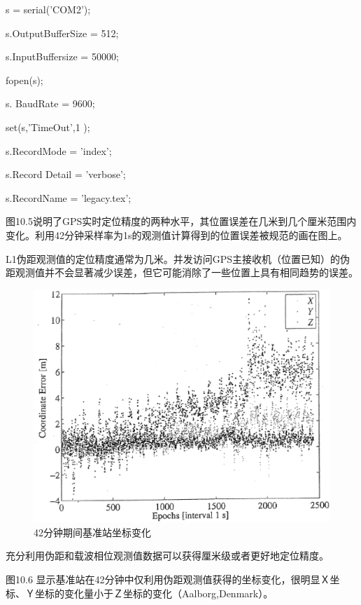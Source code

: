 s = serial('COM2');

s.OutputBufferSize = 512;

s.InputBuffersize = 50000;

fopen(s);

s. BaudRate = 9600;

set(s,'TimeOut',1 );

s.RecordMode = 'index';

s.Record Detail = 'verbose';

s.RecordName = 'legacy.tex';

图10.5说明了GPS实时定位精度的两种水平，其位置误差在几米到几个厘米范围内变化。利用42分钟采样率为1s的观测值计算得到的位置误差被规范的画在图上。

L1伪距观测值的定位精度通常为几米。并发访问GPS主接收机（位置已知）的伪距观测值并不会显著减少误差，但它可能消除了一些位置上具有相同趋势的误差。

\begin{figure}
	\centering
	\includegraphics[width=0.4\linewidth]{TeX_files/Part03/chapter10/image/9-6}
	\caption{42分钟期间基准站坐标变化}
	\label{fig:9-6}
\end{figure}

充分利用伪距和载波相位观测值数据可以获得厘米级或者更好地定位精度。

图10.6 显示基准站在42分钟中仅利用伪距观测值获得的坐标变化，很明显Ｘ坐标、Ｙ坐标的变化量小于Ｚ坐标的变化（Aalborg,Denmark）。